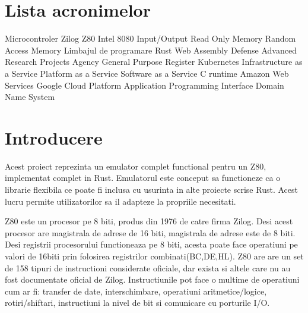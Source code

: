 \documentclass[titlepage,12pt]{article}
\begin{document}
\section*{Lista acronimelor} %
\begin{acronym}
           {Microcontroler Zilog Z80}
         {Intel 8080}
            {Input/Output}
           {Read Only Memory}
           {Random Access Memory}
          {Limbajul de programare Rust}
          {Web Assembly}
         {Defense Advanced Research Projects Agency}
           {General Purpose Register}
           {Kubernetes}
          {Infrastructure as a Service}
          {Platform as a Service}
          {Software as a Service}
           {C runtime}
           {Amazon Web Services}
           {Google Cloud Platform}
           {Application Programming Interface}
           {Domain Name System}
\end{acronym}
\clearpage

\section{Introducere}
Acest proiect reprezinta un emulator complet functional pentru un \ac {Z80}, implementat complet in \ac {Rust}.
Emulatorul este conceput sa functioneze ca o librarie flexibila ce poate fi inclusa cu usurinta in alte proiecte scrise Rust. Acest lucru permite utilizatorilor sa il adapteze la propriile necesitati.

\ac {Z80} este un procesor pe 8 biti, produs din 1976 de catre firma Zilog. Desi acest procesor are magistrala de adrese de 16 biti, magistrala de adrese este de 8 biti.
Desi registrii procesorului functioneaza pe 8 biti, acesta poate face operatiuni pe valori de 16biti prin folosirea registrilor combinati(BC,DE,HL).
Z80 are are un set de 158 tipuri de instructioni considerate oficiale, dar exista si altele care nu au fost documentate oficial de Zilog. Instructiunile pot face o multime de operatiuni cum ar fi: transfer de date, interschimbare, operatiuni aritmetice/logice, rotiri/shiftari, instructiuni la nivel de bit si comunicare cu porturile I/O.
\end{document}
